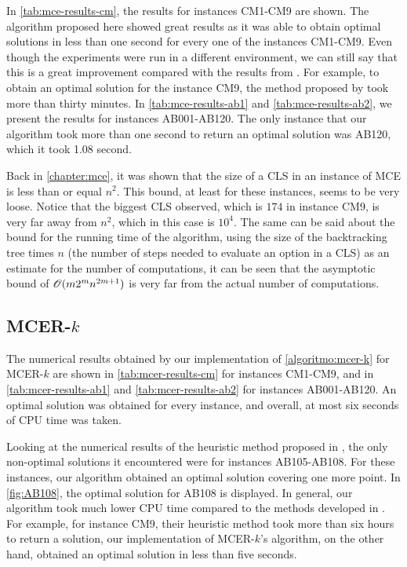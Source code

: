 In \autoref{tab:mce-results-cm}, the results for instances CM1-CM9 are shown. 
The algorithm proposed here showed great results as it was able to obtain optimal solutions in less than one second for every one of the instances CM1-CM9.
Even though the experiments were run in a different environment, we can still say that this is a great improvement compared with the results from . For example, to obtain an optimal solution for the instance CM9, the method proposed by  took more than thirty minutes.
In \autoref{tab:mce-results-ab1} and \autoref{tab:mce-results-ab2}, we present the results for instances AB001-AB120. The only instance that our algorithm took more than one second to return an optimal solution was AB120, which it took 1.08 second.

Back in \autoref{chapter:mce}, it was shown that the size of a CLS in an instance of MCE is less than or equal $n^2$. This bound, at least for these instances, seems to be very loose. Notice that the biggest CLS observed, which is $174$ in instance CM9, is very far away from $n^2$, which in this case is $10^4$.
The same can be said about the bound for the running time of the algorithm, using the size of the backtracking tree times $n$ (the number of steps needed to evaluate an option in a CLS) as an estimate for the number of computations, it can be seen that the asymptotic bound of $\mathscr{O}(m2^mn^{2m+1})$ is very far from the actual number of computations.

\subsection{MCER-$k$}

The numerical results obtained by our implementation of \autoref{algoritmo:mcer-k} for MCER-$k$ are shown in \autoref{tab:mcer-results-cm} for instances CM1-CM9, and in \autoref{tab:mcer-results-ab1} and \autoref{tab:mcer-results-ab2} for instances AB001-AB120. 
An optimal solution was obtained for every instance, and overall, at most six seconds of CPU time was taken.

Looking at the numerical results of the heuristic method proposed in , the only non-optimal solutions it encountered were for instances AB105-AB108. For these instances, our algorithm obtained an optimal solution covering one more point. In \autoref{fig:AB108}, the optimal solution for AB108 is displayed.
In general, our algorithm took much lower CPU time compared to the methods developed in . For example, for instance CM9, their heuristic method took more than six hours to return a solution, our implementation of MCER-$k$'s algorithm, on the other hand, obtained an optimal solution in less than five seconds.

